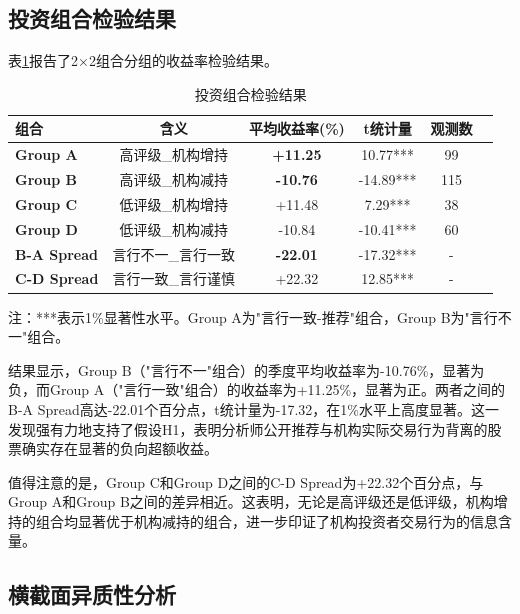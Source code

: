 \documentclass[12pt,a4paper]{article}
\begin{document}
\subsection{投资组合检验结果}

表\ref{tab:portfolio}报告了2×2组合分组的收益率检验结果。

\begin{table}[htbp]
  \centering
  \caption{投资组合检验结果}
  \label{tab:portfolio}
  \begin{threeparttable}
    \begin{tabular}{lccccc}
      \toprule
      \textbf{组合} & \textbf{含义} & \textbf{平均收益率(\%)} & \textbf{t统计量} & \textbf{观测数} \\
      \midrule
      \textbf{Group A} & 高评级\_机构增持 & \textbf{+11.25} & 10.77*** & 99 \\
      \textbf{Group B} & 高评级\_机构减持 & \textbf{-10.76} & -14.89*** & 115 \\
      \textbf{Group C} & 低评级\_机构增持 & +11.48 & 7.29*** & 38 \\
      \textbf{Group D} & 低评级\_机构减持 & -10.84 & -10.41*** & 60 \\
      \midrule
      \textbf{B-A Spread} & 言行不一\_言行一致 & \textbf{-22.01} & -17.32*** & - \\
      \textbf{C-D Spread} & 言行一致\_言行谨慎 & +22.32 & 12.85*** & - \\
      \bottomrule
    \end{tabular}
    \begin{tablenotes}
      \footnotesize
      \item 注：***表示1\%显著性水平。Group A为"言行一致-推荐"组合，Group B为"言行不一"组合。
    \end{tablenotes}
  \end{threeparttable}
\end{table}

结果显示，Group B（"言行不一"组合）的季度平均收益率为-10.76\%，显著为负，而Group A（"言行一致"组合）的收益率为+11.25\%，显著为正。两者之间的B-A Spread高达-22.01个百分点，t统计量为-17.32，在1\%水平上高度显著。这一发现强有力地支持了假设H1，表明分析师公开推荐与机构实际交易行为背离的股票确实存在显著的负向超额收益。

值得注意的是，Group C和Group D之间的C-D Spread为+22.32个百分点，与Group A和Group B之间的差异相近。这表明，无论是高评级还是低评级，机构增持的组合均显著优于机构减持的组合，进一步印证了机构投资者交易行为的信息含量。

\subsection{横截面异质性分析}
\end{document}
